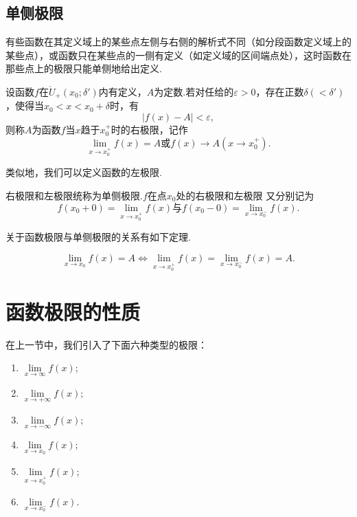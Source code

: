 \subsection{单侧极限}
有些函数在其定义域上的某些点左侧与右侧的解析式不同（如分段函数定义域上的某些点），或函数只在某些点的一侧有定义（如定义域的区间端点处），这时函数在那些点上的极限只能单侧地给出定义.
\begin{definition}
	设函数$f$在$\mathring{U}_+(x_0;\delta')$内有定义，$A$为定数.若对任给的$\varepsilon>0$，存在正数$\delta(<\delta')$，使得当$x_0<x<x_0+\delta$时，有
	$$|f(x)-A|<\varepsilon,$$
	则称$A$为函数$f$当$x$趋于$x_0^+$时的右极限，记作
	$$\lim\limits_{x\to x_0^+}f(x)=A\text{或}f(x)\to A(x\to x_0^+).$$
\end{definition}
类似地，我们可以定义函数的左极限.

右极限和左极限统称为单侧极限.$f$在点$x_0$处的右极限和左极限 又分别记为
$$f(x_0+0)=\lim\limits_{x\to x_0^+}f(x)\text{与}f(x_0-0)=\lim\limits_{x\to x_0^-}f(x).$$

关于函数极限与单侧极限的关系有如下定理.
\begin{theorem}
	$$\lim\limits_{x\to x_0}f(x)=A\iff \lim\limits_{x\to x_0^+}f(x)=\lim\limits_{x\to x_0^-}f(x)=A.$$
\end{theorem}
\section{函数极限的性质}
在上一节中，我们引入了下面六种类型的极限：
\begin{enumerate}
	\item $\lim\limits_{x\to\infty}f(x);$
	\item $\lim\limits_{x\to+\infty}f(x);$
	\item $\lim\limits_{x\to-\infty}f(x);$
	\item $\lim\limits_{x\to x_0}f(x);$
	\item $\lim\limits_{x\to x_0^+}f(x);$
	\item $\lim\limits_{x\to x_0^-}f(x).$
\end{enumerate}

